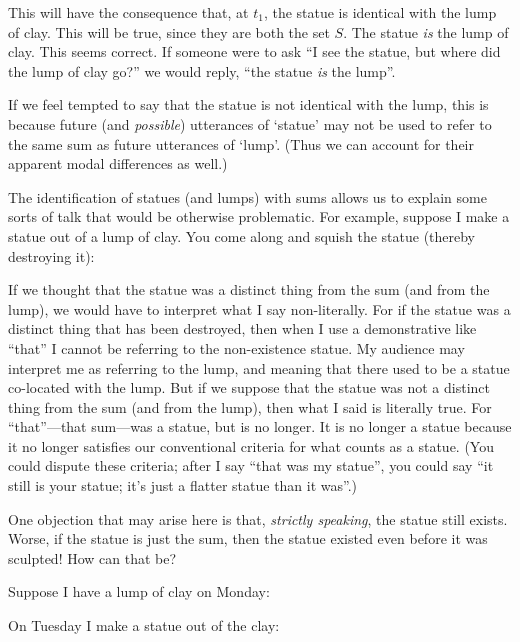 \documentclass[11pt]{article}
\begin{document}
\begin{spacing}{1.5}
This will have the consequence that, at $t_1$, the statue is identical
with the lump of clay.  This will be true, since they are both the set
$S$.  The statue {\em is} the lump of clay.  This seems correct.  If
someone were to ask ``I see the statue, but where did the lump of clay
go?'' we would reply, ``the statue {\em is} the lump''.

If we feel tempted to say that the statue is not identical with the
lump, this is because future (and {\em possible}) utterances of
`statue' may not be used to refer to the same sum as future utterances
of `lump'.  (Thus we can account for their apparent modal differences
as well.)

The identification of statues (and lumps) with sums allows us to
explain some sorts of talk that would be otherwise problematic.  For
example, suppose I make a statue out of a lump of clay.  You come
along and squish the statue (thereby destroying it):


If we thought that the statue was a distinct thing from the sum (and
from the lump), we would have to interpret what I say non-literally.
For if the statue was a distinct thing that has been destroyed, then
when I use a demonstrative like ``that'' I cannot be referring to the
non-existence statue.  My audience may interpret me as referring to
the lump, and meaning that there used to be a statue co-located with
the lump.  But if we suppose that the statue was not a distinct thing
from the sum (and from the lump), then what I said is literally true.
For ``that''---that sum---was a statue, but is no longer.  It is no
longer a statue because it no longer satisfies our conventional
criteria for what counts as a statue.  (You could dispute these
criteria; after I say ``that was my statue'', you could say ``it still
is your statue; it's just a flatter statue than it was''.)

One objection that may arise here is that, {\em strictly speaking},
the statue still exists.  Worse, if the statue is just the sum, then
the statue existed even before it was sculpted!  How can that be?

Suppose I have a lump of clay on Monday:


On Tuesday I make a statue out of the clay:



\end{spacing}
\end{document}
